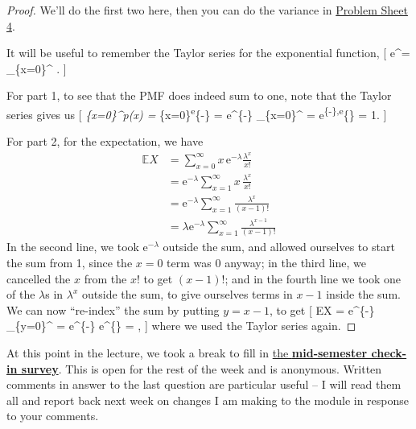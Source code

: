 \documentclass[
  letterpaper,
]{report}
\theoremstyle{definition}
\theoremstyle{definition}
\theoremstyle{remark}
\begin{document}
\begin{proof}

We'll do the first two here, then you can do the variance in
\protect\hyperlink{P4-long}{Problem Sheet 4}.

It will be useful to remember the Taylor series for the exponential
function, {[} \mathrm e\^{}\lambda =
\sum\_\{x=0\}\^{}\infty {} . {]}

For part 1, to see that the PMF does indeed sum to one, note that the
Taylor series gives us {[} \sum\emph{\{x=0\}\^{}\infty p(x) =
\sum}\{x=0\}\textsuperscript{\infty \mathrm e}\{-\lambda\}
 = \mathrm e\^{}\{-\lambda\}
\sum\_\{x=0\}\^{}\infty  {} =
\mathrm e\textsuperscript{\{-\lambda\},\mathrm e}\{\lambda\} = 1. {]}

For part 2, for the expectation, we have \begin{align*}
\mathbb EX &= \sum_{x=0}^\infty x\,\mathrm e^{-\lambda}  \frac{\lambda^x}{x!} \\
  &= \mathrm e^{-\lambda} \sum_{x=1}^\infty x\,\frac{\lambda^x}{x!} \\
  &= \mathrm e^{-\lambda} \sum_{x=1}^\infty \frac{\lambda^x}{(x-1)!} \\
  &= \lambda \mathrm e^{-\lambda} \sum_{x=1}^\infty \frac{\lambda^{x-1}}{(x-1)!}
\end{align*} In the second line, we took \(\mathrm e^{-\lambda}\)
outside the sum, and allowed ourselves to start the sum from 1, since
the \(x = 0\) term was 0 anyway; in the third line, we cancelled the
\(x\) from the \(x!\) to get \((x-1)!\); and in the fourth line we took
one of the \(\lambda\)s in \(\lambda^x\) outside the sum, to give
ourselves terms in \(x - 1\) inside the sum. We can now ``re-index'' the
sum by putting \(y = x - 1\), to get {[} \mathbb EX =
\lambda \mathrm e\^{}\{-\lambda\}
\sum\_\{y=0\}\^{}\infty {} =
\lambda \mathrm e\^{}\{-\lambda\} \mathrm e\^{}\{\lambda\} = \lambda ,
{]} where we used the Taylor series again.

\end{proof}

At this point in the lecture, we took a break to fill in
\href{https://forms.office.com/Pages/ResponsePage.aspx?id=qO3qvR3IzkWGPlIypTW3ywARQdZlKXRHsLcXi_ngX8NUNkoxWUlTSTBXQUVSUThGU0pXOTMwTjA0UC4u}{the
\textbf{mid-semester check-in survey}}. This is open for the rest of the
week and is anonymous. Written comments in answer to the last question
are particular useful -- I will read them all and report back next week
on changes I am making to the module in response to your comments.
\end{document}
